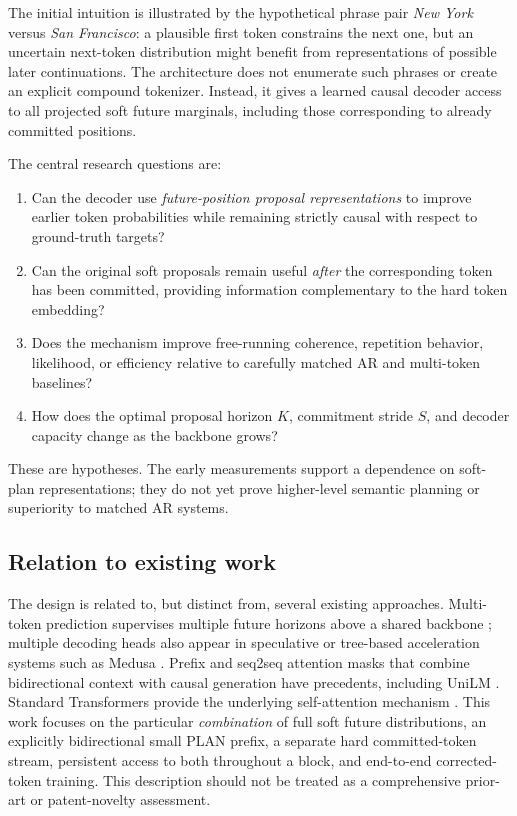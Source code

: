\documentclass[11pt,letterpaper]{article}
\begin{document}
The initial intuition is illustrated by the hypothetical phrase pair \emph{New York} versus \emph{San Francisco}: a plausible first token constrains the next one, but an uncertain next-token distribution might benefit from representations of possible later continuations. The architecture does not enumerate such phrases or create an explicit compound tokenizer. Instead, it gives a learned causal decoder access to all projected soft future marginals, including those corresponding to already committed positions.

The central research questions are:
\begin{enumerate}
\item Can the decoder use \emph{future-position proposal representations} to improve earlier token probabilities while remaining strictly causal with respect to ground-truth targets?
\item Can the original soft proposals remain useful \emph{after} the corresponding token has been committed, providing information complementary to the hard token embedding?
\item Does the mechanism improve free-running coherence, repetition behavior, likelihood, or efficiency relative to carefully matched AR and multi-token baselines?
\item How does the optimal proposal horizon $K$, commitment stride $S$, and decoder capacity change as the backbone grows?
\end{enumerate}
These are hypotheses. The early measurements support a dependence on soft-plan representations; they do not yet prove higher-level semantic planning or superiority to matched AR systems.

\subsection{Relation to existing work}
The design is related to, but distinct from, several existing approaches. Multi-token prediction supervises multiple future horizons above a shared backbone \cite{gloeckle2024}; multiple decoding heads also appear in speculative or tree-based acceleration systems such as Medusa \cite{cai2024}. Prefix and seq2seq attention masks that combine bidirectional context with causal generation have precedents, including UniLM \cite{dong2019}. Standard Transformers provide the underlying self-attention mechanism \cite{vaswani2017}. This work focuses on the particular \emph{combination} of full soft future distributions, an explicitly bidirectional small PLAN prefix, a separate hard committed-token stream, persistent access to both throughout a block, and end-to-end corrected-token training. This description should not be treated as a comprehensive prior-art or patent-novelty assessment.
\end{document}
